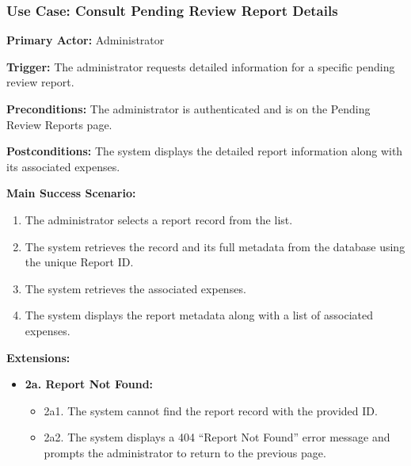 \subsubsection{\textbf{Use Case: Consult Pending Review Report Details}}

\textbf{Primary Actor:} Administrator

\textbf{Trigger:} The administrator requests detailed information for a specific pending review report.

\textbf{Preconditions:} The administrator is authenticated and is on the Pending Review Reports page.

\textbf{Postconditions:} The system displays the detailed report information along with its associated expenses.

\vspace{0.5cm}

\textbf{Main Success Scenario:}

\begin{enumerate} [leftmargin=0.75cm, noitemsep]
\item The administrator selects a report record from the list.
\item The system retrieves the record and its full metadata from the database using the unique Report ID.
\item The system retrieves the associated expenses.
\item The system displays the report metadata along with a list of associated expenses.
\end{enumerate}

\vspace{0.3cm}

\textbf{Extensions:}

\begin{itemize} [label={}, leftmargin=0.75cm, noitemsep]

    \item \textbf{2a. Report Not Found:}
    \begin{itemize} [label={},leftmargin=0.75cm, noitemsep]
        \item 2a1. The system cannot find the report record with the provided ID.
        \item 2a2. The system displays a 404 ``Report Not Found'' error message and prompts the administrator to return to the previous page.
    \end{itemize}

\end{itemize}

\vspace{0.3cm}
